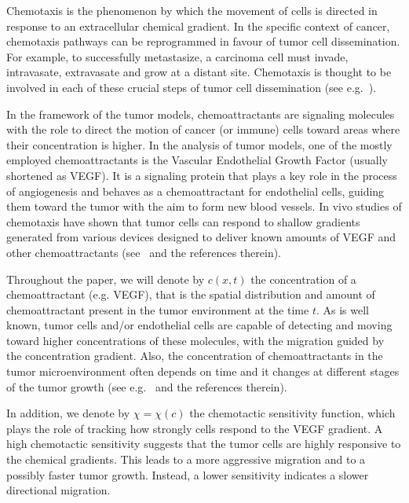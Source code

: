 \documentclass[12pt,a4paper,intlimits,sumlimits]{amsart}
\theoremstyle{definition}
\theoremstyle{plain}
\numberwithin{equation}{section}
\begin{document}
Chemotaxis is the phenomenon by which the movement of cells is directed in response to an extracellular chemical gradient. In the specific context of cancer, chemotaxis pathways can be reprogrammed in favour of tumor cell dissemination.  For example, to successfully metastasize, a carcinoma cell must invade, intravasate, extravasate and grow at a distant site. Chemotaxis is thought to be involved in each of these crucial steps of tumor cell dissemination (see e.g.~\cite{PMC4030706}).

In the framework of the tumor models, chemoattractants are signaling molecules with the role to direct the motion of cancer (or immune) cells toward areas where their concentration is higher.
In the analysis of tumor models,  one of the mostly employed chemoattractants is the Vascular Endothelial Growth Factor (usually shortened as VEGF). It is a signaling protein that plays a key role in the process of angiogenesis and behaves as a chemoattractant for endothelial cells, guiding them toward the tumor with the aim to form new blood vessels. 
In vivo studies of chemotaxis have shown that tumor cells can respond to shallow gradients generated from various devices designed to deliver known amounts of VEGF and other chemoattractants (see~\cite[page 12]{PMC4030706} and the references therein).

Throughout the paper, we will denote by $c(x, t)$ the concentration of a chemoattractant (e.g. VEGF), that is the spatial distribution and amount of chemoattractant present in the tumor environment at the time $t$. As is well known, tumor cells and/or endothelial cells are capable of detecting and moving toward higher concentrations of these molecules, with the migration guided by the concentration gradient. Also, the concentration of chemoattractants in the tumor microenvironment often depends on time and it changes at different stages of the tumor growth (see e.g.~\cite{CHAP98, MR3793187} and the references therein).

In addition, we denote by $\chi=\chi(c)$ the chemotactic sensitivity function,  which plays the role of tracking how strongly cells respond to the VEGF gradient.  A high chemotactic sensitivity suggests that the tumor cells are highly responsive to the chemical gradients. This leads to a more aggressive migration and to a possibly faster tumor growth. Instead,  a lower sensitivity indicates a slower directional migration.
\end{document}
